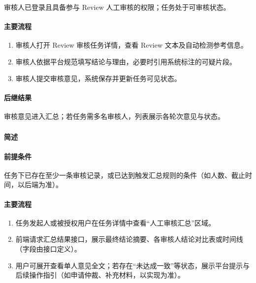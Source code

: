 审核人已登录且具备参与 Review 人工审核的权限；任务处于可审核状态。

\paragraph*{主要流程}

\begin{enumerate}
    \item 审核人打开 Review 审核任务详情，查看 Review 文本及自动检测参考信息。
    \item 审核人依据平台规范填写结论与理由，必要时引用系统标注的可疑片段。
    \item 审核人提交审核意见，系统保存并更新任务可见状态。
\end{enumerate}

\paragraph*{后继结果}

审核意见进入汇总；若任务需多名审核人，列表展示各轮次意见与状态。

\subsubsection{}

\paragraph*{简述}


\paragraph*{前提条件}

任务下已存在至少一条审核记录，或已达到触发汇总规则的条件（如人数、截止时间，以后端为准）。

\paragraph*{主要流程}

\begin{enumerate}
    \item 任务发起人或被授权用户在任务详情中查看“人工审核汇总”区域。
    \item 前端请求汇总结果接口，展示最终结论摘要、各审核人结论对比表或时间线（字段由接口定义）。
    \item 用户可展开查看单人意见全文；若存在“未达成一致”等状态，展示平台提示与后续操作指引（如申请仲裁、补充材料，以实现为准）。
\end{enumerate}

